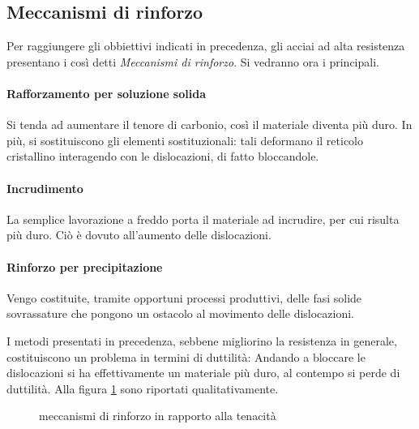 \subsection{Meccanismi di rinforzo}
Per raggiungere gli obbiettivi indicati in precedenza, gli acciai 
ad alta resistenza presentano i così detti \emph{Meccanismi di rinforzo}.
Si vedranno ora i principali.

\paragraph{Rafforzamento per soluzione solida}
Si tenda ad aumentare il tenore di carbonio, così il materiale diventa
più duro. In più, si sostituiscono gli elementi sostituzionali: tali 
deformano il reticolo cristallino interagendo con le dislocazioni, di 
fatto bloccandole.

\paragraph{Incrudimento}
La semplice lavorazione a freddo porta il materiale ad incrudire, 
per cui risulta più duro. Ciò è dovuto all'aumento delle dislocazioni.

\paragraph{Rinforzo per precipitazione}
Vengo costituite, tramite opportuni processi produttivi, delle fasi
solide sovrassature che pongono un ostacolo al movimento delle
dislocazioni.

I metodi presentati in precedenza, sebbene migliorino la resistenza
in generale, costituiscono un problema in termini di duttilità:
Andando a bloccare le dislocazioni si ha effettivamente un materiale
più duro, al contempo si perde di duttilità.
Alla figura \ref{fig:RinfTenacita} sono riportati qualitativamente.

\begin{figure}
\centering
{} \quad
{}
\caption{meccanismi di rinforzo in rapporto alla tenacità}
\label{fig:RinfTenacita}
\end{figure}

